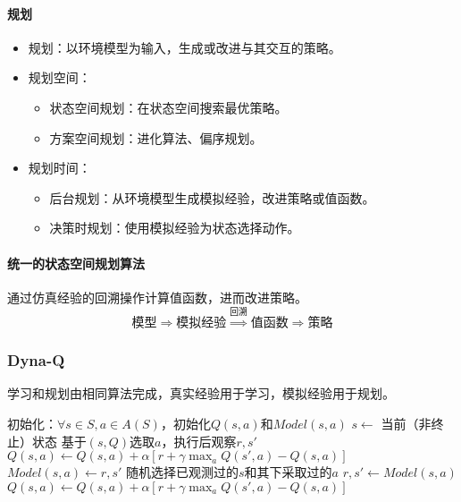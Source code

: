 \documentclass[
12pt, %
a4paper, 
oneside, %
headinclude,footinclude, %
]{scrartcl}
\begin{document}
\paragraph{规划}
\begin{itemize}
\item 规划：以环境模型为输入，生成或改进与其交互的策略。
\item 规划空间：
\begin{itemize}
\item 状态空间规划：在状态空间搜索最优策略。
\item 方案空间规划：进化算法、偏序规划。
\end{itemize}
\item 规划时间：
\begin{itemize}
\item 后台规划：从环境模型生成模拟经验，改进策略或值函数。
\item 决策时规划：使用模拟经验为状态选择动作。
\end{itemize}
\end{itemize}
\paragraph{统一的状态空间规划算法}
通过仿真经验的回溯操作计算值函数，进而改进策略。
$$ \text{模型} \Longrightarrow \text{模拟经验} \overset{\text{回溯}}{\Longrightarrow} \text{值函数} \Longrightarrow \text{策略} $$
\subsubsection[Dyna-Q]{Dyna-Q}
学习和规划由相同算法完成，真实经验用于学习，模拟经验用于规划。
\begin{myalgorithm}[Dyna-Q]
\State 初始化：$ \forall s \in S, a \in A(S) $，初始化$ Q(s, a) $和$ Model(s, a) $
\Loop
\State $ s \gets $ 当前（非终止）状态 
\State 基于$ (s, Q) $选取$ a $，执行后观察$ r,s' $ 
\State $ Q(s, a) \gets Q(s, a) + \alpha[r + \gamma \max_a Q(s', a) - Q(s, a)] $ 
\State $ Model(s, a) \gets r, s' $
 
\State 随机选择已观测过的$ s $和其下采取过的$ a $
\State $ r,s' \gets Model(s, a) $ 
\State $ Q(s, a) \gets Q(s, a) + \alpha[r + \gamma \max_a Q(s', a) - Q(s, a)] $ 
\EndFor
\EndLoop
\end{myalgorithm}
\end{document}
